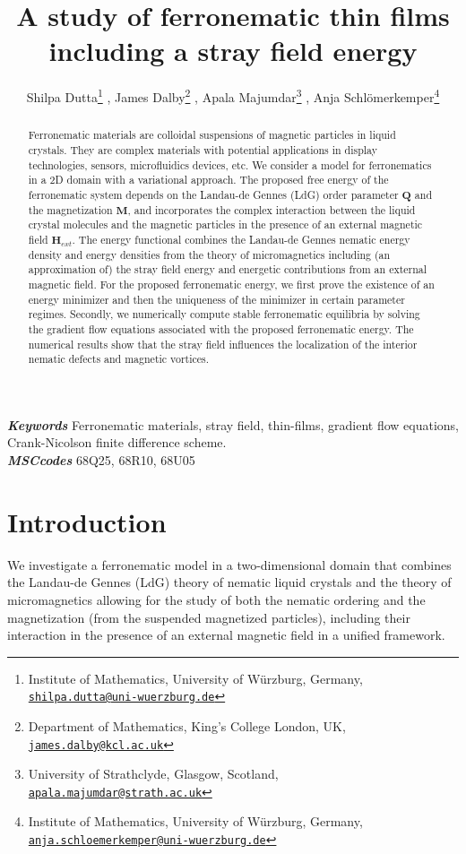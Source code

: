 \documentclass{article}
\title{A study of ferronematic thin films including a stray field energy}
\author{
Shilpa Dutta\thanks{Institute of Mathematics, 
University of W\"urzburg, Germany, 
\href{mailto:shilpa.dutta@uni-wuerzburg.de}{\texttt{shilpa.dutta@uni-wuerzburg.de}}} ,\quad
James Dalby\thanks{Department of Mathematics,
King's College London, UK, 
\href{mailto:james.dalby@kcl.ac.uk}{\texttt{james.dalby@kcl.ac.uk}}} ,\quad
Apala Majumdar\thanks{University of Strathclyde,
Glasgow, Scotland, 
\href{mailto:apala.majumdar@strath.ac.uk}{\texttt{apala.majumdar@strath.ac.uk}}} ,\quad
Anja Schlömerkemper\thanks{Institute of Mathematics,
University of W\"urzburg, Germany, 
\href{mailto:anja.schloemerkemper@uni-wuerzburg.de}{\texttt{anja.schloemerkemper@uni-wuerzburg.de}}}
}
\def\Qvec{\mathbf{Q}}
\def \Mvec{\mathbf{M}}
\def\Hvec{\mathbf{H}}
\begin{document}
\maketitle
\begin{abstract}
\noindent Ferronematic materials are colloidal suspensions of magnetic particles in liquid crystals. They are complex materials with potential applications in display technologies, sensors, microfluidics devices, etc. We consider a model for ferronematics in a 2D domain with a variational approach. The proposed free energy of the ferronematic system depends on the Landau-de Gennes (LdG) order parameter $\Qvec$ and the magnetization $\Mvec$, and incorporates the complex interaction between the liquid crystal molecules and the magnetic particles in the presence of an external magnetic field $\Hvec_{ext}$. The energy functional combines the Landau-de Gennes nematic energy density and energy densities from the theory of micromagnetics including (an approximation of) the stray field energy and energetic contributions from an external magnetic field. For the proposed ferronematic energy, we first prove the existence of an energy minimizer and then the uniqueness of the minimizer in certain parameter regimes. Secondly, we numerically compute stable ferronematic equilibria by solving the gradient flow equations associated with the proposed ferronematic energy. The numerical results show that the stray field influences the localization of the interior nematic defects and magnetic vortices.
\end{abstract}
\textbf{\textit{Keywords}}
Ferronematic materials, stray field, thin-films, gradient flow equations, Crank-Nicolson finite difference scheme. \\[0.5em]
\textbf{\textit{MSCcodes}}
68Q25, 68R10, 68U05

\section{Introduction}\label{sec:1}
 We investigate a ferronematic model in a two-dimensional domain that combines the Landau-de Gennes (LdG) theory of nematic liquid crystals \cite{Gennes} and the theory of micromagnetics \cite{brown1966magnetoelastic} allowing for the study of both the nematic ordering and the magnetization (from the suspended magnetized particles), including their interaction in the presence of an external magnetic field in a unified framework.
\end{document}
